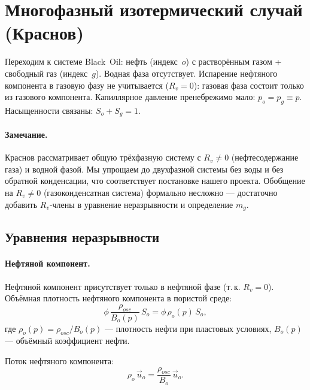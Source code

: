 ﻿\documentclass[12pt,a4paper]{article}
\begin{document}
\section{Многофазный изотермический случай (Краснов)}\label{sec:multi}

Переходим к системе Black~Oil: нефть (индекс~$o$) с растворённым
газом + свободный газ (индекс~$g$). Водная фаза отсутствует.
Испарение нефтяного компонента в газовую фазу не учитывается
($R_v = 0$): газовая фаза состоит только из газового компонента.
Капиллярное давление пренебрежимо мало: $p_o = p_g \equiv p$.
Насыщенности связаны: $S_o + S_g = 1$.

\paragraph{Замечание.}
Краснов рассматривает общую трёхфазную систему с $R_v \neq 0$
(нефтесодержание газа) и водной фазой. Мы упрощаем до двухфазной
системы без воды и без обратной конденсации, что соответствует
постановке нашего проекта. Обобщение на $R_v \neq 0$
(газоконденсатная система) формально несложно --- достаточно
добавить $R_v$-члены в уравнение неразрывности и определение $m_g$.

\subsection{Уравнения неразрывности}\label{ssec:multi_cont}

\paragraph{Нефтяной компонент.}
Нефтяной компонент присутствует только в нефтяной фазе (т.\,к.
$R_v = 0$). Объёмная плотность нефтяного компонента в пористой
среде:
\begin{equation}\label{eq:oil_mass}
  \phi\,\frac{\rho_{osc}}{B_o(p)}\,S_o
  = \phi\,\rho_o(p)\,S_o,
\end{equation}
где $\rho_o(p) = \rho_{osc}/B_o(p)$ --- плотность нефти при пластовых
условиях, $B_o(p)$ --- объёмный коэффициент нефти.

Поток нефтяного компонента:
\begin{equation}\label{eq:oil_flux}
  \rho_o\,\vec{u}_o
  = \frac{\rho_{osc}}{B_o}\,\vec{u}_o.
\end{equation}
\end{document}
